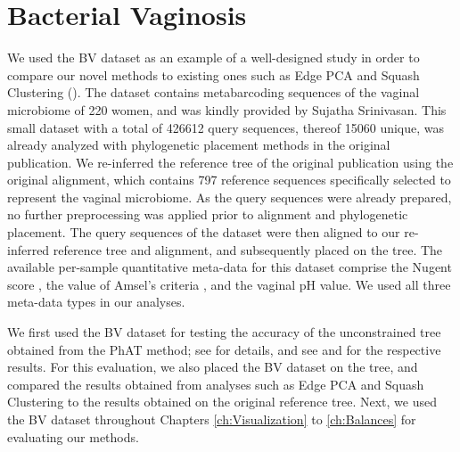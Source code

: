 \section{Bacterial Vaginosis}
\label{supp:sec:DetailsEmpiricalDatasets:sub:BV}

We used the \acf{BV} dataset \cite{Srinivasan2012} as an example of a well-designed study in order to
compare our novel methods to existing ones such as Edge PCA and Squash Clustering \cite{Matsen2011a,Evans2012}
().
The dataset contains metabarcoding sequences of the vaginal microbiome of \num{220} women,
and was kindly provided by Sujatha Srinivasan.
This small dataset with a total of \num{426 612} query sequences, thereof \num{15 060} unique,
was already analyzed with phylogenetic placement methods in the original publication.
We re-inferred the reference tree of the original publication using the original alignment,
which contains \num{797} reference sequences specifically selected to represent the vaginal microbiome.
As the query sequences were already prepared,
no further preprocessing was applied prior to alignment and phylogenetic placement.
The query sequences of the dataset were then aligned to our re-inferred reference tree and alignment,
and subsequently placed on the tree.
The available per-sample quantitative meta-data for this dataset comprise
the Nugent score \cite{Nugent1991}, the value of Amsel's criteria \cite{Amsel1983}, and the vaginal pH value.
We used all three meta-data types in our analyses.


We first used the \ac{BV} dataset for testing the accuracy of the unconstrained  tree
obtained from the \ac{PhAT} method; see  for details,
and see  and  for the respective results.
For this evaluation, we also placed the \ac{BV} dataset on the  tree,
and compared the results obtained from analyses such as Edge PCA and Squash Clustering
to the results obtained on the original reference tree.
Next, we used the \ac{BV} dataset throughout Chapters \ref{ch:Visualization} to \ref{ch:Balances} for evaluating our methods.

